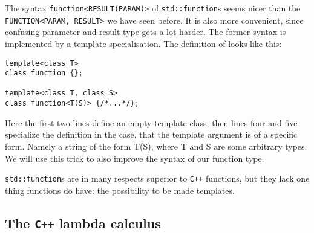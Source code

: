 \documentclass{article}
\newcommand{\cc}{\texttt{C++}\xspace}
\newcommand{\ir}[1]{\texttt{#1}}
\newcommand{\code}[1]{\texttt{#1}}
\begin{document}
The syntax \code{function<RESULT(PARAM)>} of \code{std::function}s seems nicer than the \ir{FUNCTION<PARAM, RESULT>} we have seen before. It is also more convenient, since confusing parameter and result type gets a lot harder. The former syntax is implemented by a template specialisation. The definition of looks like this:
\begin{lstlisting}
template<class T>
class function {};

template<class T, class S>
class function<T(S)> {/*...*/};
\end{lstlisting}
Here the first two lines define an empty template class, then lines four and five specialize the definition in the case, that the template argument is of a specific form. Namely a string of the form T(S), where T and S are some arbitrary types. We will use this trick to also improve the syntax of our function type.

\code{std::function}s are in many respects superior to \cc functions, but they lack one thing functions do have: the possibility to be made templates.


\subsection{The \cc lambda calculus}\label{sec: The C++ lambda calculus}
\end{document}
